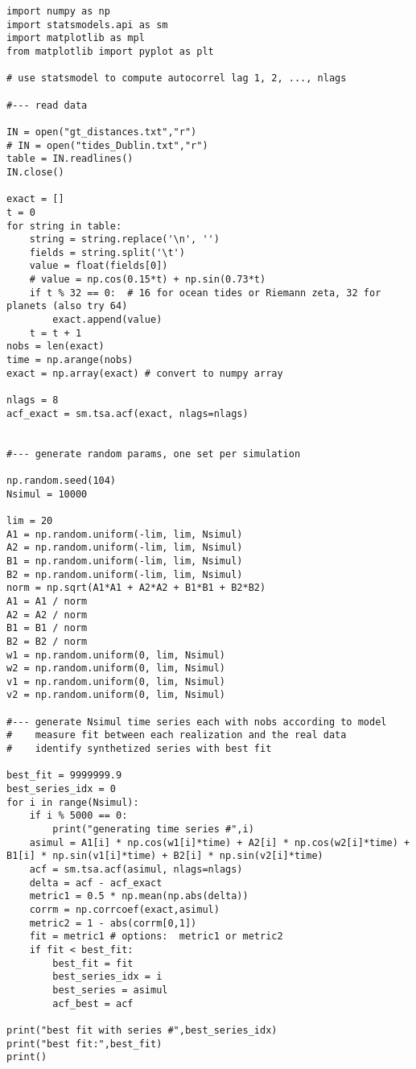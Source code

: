 \documentclass[oneside,10pt]{book}
\begin{document}
\begin{lstlisting}
import numpy as np
import statsmodels.api as sm
import matplotlib as mpl
from matplotlib import pyplot as plt

# use statsmodel to compute autocorrel lag 1, 2, ..., nlags

#--- read data 

IN = open("gt_distances.txt","r") 
# IN = open("tides_Dublin.txt","r") 
table = IN.readlines()
IN.close()

exact = []
t = 0
for string in table: 
    string = string.replace('\n', '')
    fields = string.split('\t')
    value = float(fields[0]) 
    # value = np.cos(0.15*t) + np.sin(0.73*t) 
    if t % 32 == 0:  # 16 for ocean tides or Riemann zeta, 32 for planets (also try 64)
        exact.append(value)  
    t = t + 1   
nobs = len(exact)
time = np.arange(nobs)
exact = np.array(exact) # convert to numpy array

nlags = 8
acf_exact = sm.tsa.acf(exact, nlags=nlags)  


#--- generate random params, one set per simulation

np.random.seed(104)
Nsimul = 10000

lim = 20
A1 = np.random.uniform(-lim, lim, Nsimul)
A2 = np.random.uniform(-lim, lim, Nsimul)
B1 = np.random.uniform(-lim, lim, Nsimul)
B2 = np.random.uniform(-lim, lim, Nsimul)
norm = np.sqrt(A1*A1 + A2*A2 + B1*B1 + B2*B2)
A1 = A1 / norm
A2 = A2 / norm
B1 = B1 / norm
B2 = B2 / norm
w1 = np.random.uniform(0, lim, Nsimul)
w2 = np.random.uniform(0, lim, Nsimul)
v1 = np.random.uniform(0, lim, Nsimul)
v2 = np.random.uniform(0, lim, Nsimul)

#--- generate Nsimul time series each with nobs according to model
#    measure fit between each realization and the real data
#    identify synthetized series with best fit

best_fit = 9999999.9
best_series_idx = 0
for i in range(Nsimul):
    if i % 5000 == 0:
        print("generating time series #",i)
    asimul = A1[i] * np.cos(w1[i]*time) + A2[i] * np.cos(w2[i]*time) + B1[i] * np.sin(v1[i]*time) + B2[i] * np.sin(v2[i]*time)
    acf = sm.tsa.acf(asimul, nlags=nlags) 
    delta = acf - acf_exact
    metric1 = 0.5 * np.mean(np.abs(delta)) 
    corrm = np.corrcoef(exact,asimul)
    metric2 = 1 - abs(corrm[0,1])
    fit = metric1 # options:  metric1 or metric2 
    if fit < best_fit:
        best_fit = fit
        best_series_idx = i
        best_series = asimul
        acf_best = acf

print("best fit with series #",best_series_idx)
print("best fit:",best_fit)
print()


\end{lstlisting}
\end{document}
